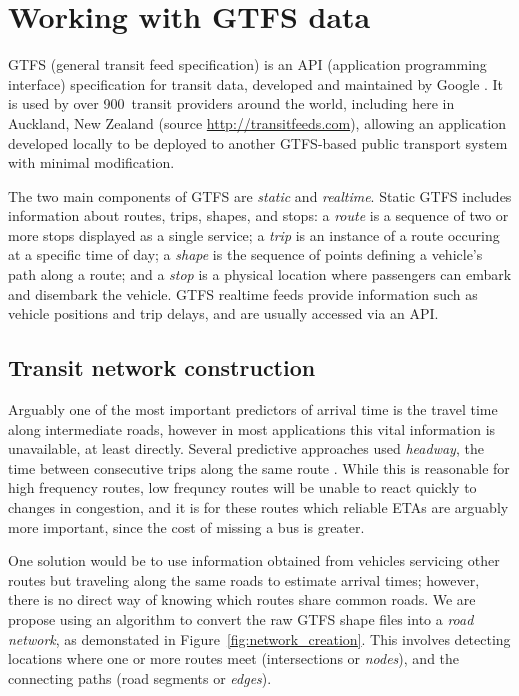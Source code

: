 \section{Working with GTFS data}
\label{sec:gtfs}

GTFS (general transit feed specification)
is an API (application programming interface) specification for transit data,
developed and maintained by Google \citep{GoogleDevelopers_2006}.
It is used by over 900~transit providers around the world,
including here in Auckland, New Zealand
(source \url{http://transitfeeds.com}),
allowing an application developed locally to
be deployed to another GTFS-based public transport system with minimal modification.


The two main components of GTFS are \emph{static} and \emph{realtime}.
Static GTFS includes information about routes, trips, shapes, and stops:
a \emph{route} is a sequence of two or more stops displayed as a single service;
a \emph{trip} is an instance of a route occuring at a specific time of day;
a \emph{shape} is the sequence of points defining a vehicle's path along a route;
and a \emph{stop} is a physical location where passengers can embark and disembark
the vehicle.
GTFS realtime feeds provide information such as vehicle positions and trip delays,
and are usually accessed via an API.

\subsection{Transit network construction}
\label{sec:network_build}

Arguably one of the most important predictors of arrival time is
the travel time along intermediate roads,
however in most applications this vital information is unavailable,
at least directly. 
Several predictive approaches used \emph{headway},
the time between consecutive trips along the same route
\citep{Hans_2015}.
While this is reasonable for high frequency routes,
low frequncy routes will be unable to react quickly to changes in congestion,
and it is for these routes which reliable ETAs are arguably more important,
since the cost of missing a bus is greater.


One solution would be to use information obtained from
vehicles servicing other routes but traveling along the same roads
to estimate arrival times;
however, there is no direct way of knowing which routes share common roads.
We are propose using an algorithm to convert the raw GTFS shape files
into a \emph{road network},
as demonstated in Figure~\ref{fig:network_creation}.
This involves detecting locations where one or more routes meet 
(intersections or \emph{nodes}),
and the connecting paths (road segments or \emph{edges}).






